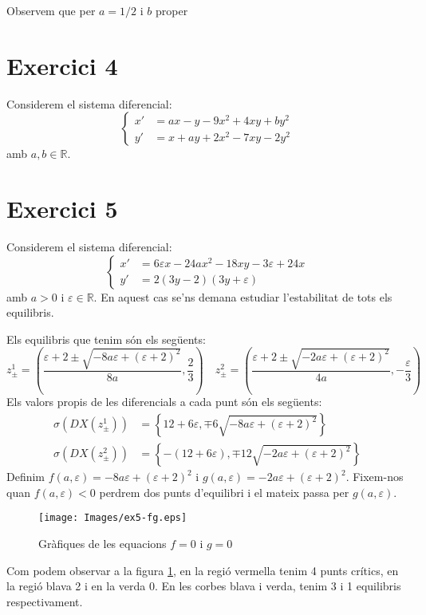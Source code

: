 \documentclass[a4paper]{article}
\newcommand{\RR}{\ensuremath{\mathbb{R}}} %
\theoremstyle{definition}
\begin{document}
Observem que per $a=1/2$ i $b$ proper
\section*{Exercici 4}
Considerem el sistema diferencial:
\begin{equation}\label{sis4}
  \left\{
  \begin{aligned}
    x' & =ax-y-9x^2+4xy+by^2   \\
    y' & =x +ay+2x^2-7xy -2y^2
  \end{aligned}
  \right.
\end{equation}
amb $a,b\in\RR$.


\section*{Exercici 5}
Considerem el sistema diferencial:
\begin{equation}\label{sis5}
  \left\{
  \begin{aligned}
    x' & = 6\varepsilon x-24ax^2-18xy-3\varepsilon+24x \\
    y' & =2(3y-2)(3y+\varepsilon)
  \end{aligned}
  \right.
\end{equation}
amb $a>0$ i $\varepsilon\in\RR$. En aquest cas se'ns demana estudiar l'estabilitat de tots els equilibris.

Els equilibris que tenim són els següents:
$$z_\pm^1= \left(\frac{\varepsilon+2\pm\sqrt{-8a\varepsilon+{(\varepsilon+2)}^2}}{8a},\frac{2}{3}\right) \quad z_\pm^2= \left(\frac{\varepsilon+2\pm\sqrt{-2a\varepsilon+{(\varepsilon+2)}^2}}{4a},-\frac{\varepsilon}{3}\right)$$
Els valors propis de les diferencials a cada punt són els següents:
\begin{align*}
  \sigma(DX(z_\pm^1)) & =\left\{12+6\varepsilon, \mp6\sqrt{-8a\varepsilon+{(\varepsilon+2)}^2}\right\}     \\
  \sigma(DX(z_\pm^2)) & =\left\{-(12+6\varepsilon), \mp12\sqrt{-2a\varepsilon+{(\varepsilon+2)}^2}\right\}
\end{align*}
Definim $f(a, \varepsilon)=-8a\varepsilon+{(\varepsilon+2)}^2$ i $g(a, \varepsilon) =-2a\varepsilon+{(\varepsilon+2)}^2$. Fixem-nos quan $f(a, \varepsilon)< 0$ perdrem dos punts d'equilibri i el mateix passa per $g(a,\varepsilon)$.
\begin{figure}[ht]
  \centering
  \texttt{[image: Images/ex5-fg.eps]}
  \caption{Gràfiques de les equacions $f=0$ i $g=0$}
  \label{ex5fg}
\end{figure}
Com podem observar a la figura \ref{ex5fg}, en la regió vermella tenim 4 punts crítics, en la regió blava 2 i en la verda 0. En les corbes blava i verda, tenim 3 i 1 equilibris respectivament.
\end{document}
